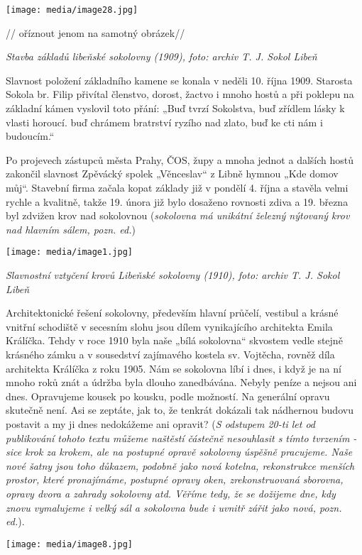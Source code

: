 \texttt{[image: media/image28.jpg]}

// oříznout jenom na samotný obrázek//

\emph{Stavba základů libeňské sokolovny (1909), foto: archiv T. J. Sokol
Libeň}

Slavnost položení základního kamene se konala v neděli 10. října 1909.
Starosta Sokola br. Filip přivítal členstvo, dorost, žactvo i mnoho
hostů a při poklepu na základní kámen vyslovil toto přání: „Buď tvrzí
Sokolstva, buď zřídlem lásky k vlasti horoucí. buď chrámem bratrství
ryzího nad zlato, buď ke cti nám i budoucím.``

Po projevech zástupců města Prahy, ČOS, župy a mnoha jednot a dalších
hostů zakončil slavnost Zpěvácký spolek „Věnceslav`` z Libně hymnou „Kde
domov můj``. Stavební firma začala kopat základy již v pondělí 4. října
a stavěla velmi rychle a kvalitně, takže 19. února již bylo dosaženo
rovnosti zdiva a 19. března byl zdvižen krov nad sokolovnou
(\emph{sokolovna má unikátní železný nýtovaný krov nad hlavním sálem,
pozn. ed.})

\texttt{[image: media/image1.jpg]}

\emph{Slavnostní vztyčení krovů Libeňské sokolovny (1910), foto: archiv
T. J. Sokol Libeň}

Architektonické řešení sokolovny, především hlavní průčelí, vestibul a
krásné vnitřní schodiště v secesním slohu jsou dílem vynikajícího
architekta Emila Králíčka. Tehdy v roce 1910 byla naše „bílá sokolovna``
skvostem vedle stejně krásného zámku a v sousedství zajímavého kostela
sv. Vojtěcha, rovněž díla architekta Králíčka z roku 1905. Nám se
sokolovna líbí i dnes, i když je na ní mnoho roků znát a údržba byla
dlouho zanedbávána. Nebyly peníze a nejsou ani dnes. Opravujeme kousek
po kousku, podle možností. Na generální opravu skutečně není. Asi se
zeptáte, jak to, že tenkrát dokázali tak nádhernou budovu postavit a my
ji dnes nedokážeme ani opravit? (\emph{S odstupem 20-ti let od
publikování tohoto textu můžeme naštěstí částečně nesouhlasit s tímto
tvrzením - sice krok za krokem, ale na postupné opravě sokolovny úspěšně
pracujeme. Naše nové šatny jsou toho důkazem, podobně jako nová kotelna,
rekonstrukce menších prostor, které pronajímáme, postupné opravy oken,
zrekonstruovaná sborovna, opravy dvora a zahrady sokolovny atd. Věříme
tedy, že se dožijeme dne, kdy znovu vymalujeme i velký sál a sokolovna
bude i uvnitř zářit jako nová, pozn. ed.}).

\texttt{[image: media/image8.jpg]}

